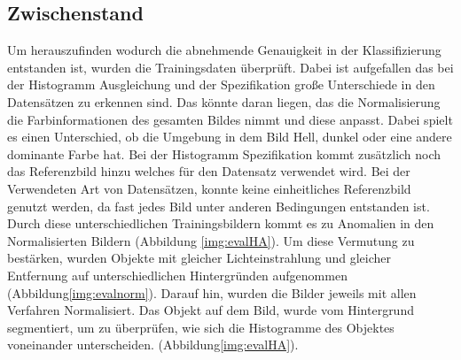 \documentclass[a4paper,12pt,oneside]{article}
\begin{document}
\subsection{Zwischenstand}
Um herauszufinden wodurch die abnehmende Genauigkeit in der Klassifizierung entstanden ist, wurden die Trainingsdaten überprüft. Dabei ist aufgefallen das bei der Histogramm Ausgleichung und der Spezifikation große Unterschiede in den Datensätzen zu erkennen sind. Das könnte daran liegen, das die Normalisierung die Farbinformationen des gesamten Bildes nimmt und diese anpasst. Dabei spielt es einen Unterschied, ob die Umgebung in dem Bild Hell, dunkel oder eine andere dominante Farbe hat. Bei der Histogramm Spezifikation kommt zusätzlich noch das Referenzbild hinzu welches für den Datensatz verwendet wird. Bei der Verwendeten Art von Datensätzen, konnte keine einheitliches Referenzbild genutzt werden, da fast jedes Bild unter anderen Bedingungen entstanden ist. Durch diese unterschiedlichen Trainingsbildern kommt es zu Anomalien in den Normalisierten Bildern (Abbildung \ref{img:evalHA}). Um diese Vermutung zu bestärken, wurden Objekte mit gleicher Lichteinstrahlung und gleicher Entfernung auf unterschiedlichen Hintergründen aufgenommen (Abbildung\ref{img:evalnorm}). Darauf hin, wurden die Bilder jeweils mit allen Verfahren Normalisiert. Das Objekt auf dem Bild, wurde vom Hintergrund segmentiert, um zu überprüfen, wie sich die Histogramme des Objektes voneinander unterscheiden. (Abbildung\ref{img:evalHA}).\\
\end{document}
